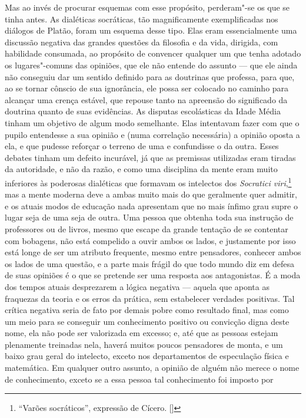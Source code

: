 Mas ao invés de procurar esquemas com esse propósito, perderam"-se os
que se tinha antes. As dialéticas socráticas, tão magnificamente
exemplificadas nos diálogos de Platão, foram um esquema desse tipo.
Elas eram essencialmente uma discussão negativa das grandes questões da
filosofia e da vida, dirigida, com habilidade consumada, ao propósito
de convencer qualquer um que tenha adotado os lugares"-comuns das
opiniões, que ele não entende do assunto --- que ele ainda não
conseguiu dar um sentido definido para as doutrinas que professa, para
que, ao se tornar cônscio de sua ignorância, ele possa ser colocado no
caminho para alcançar uma crença estável, que repouse tanto na
apreensão do significado da doutrina quanto de suas evidências.
As disputas escolásticas da Idade Média tinham um objetivo de algum
modo semelhante. Elas intentavam fazer com que o pupilo entendesse a
sua opinião e (numa correlação necessária) a opinião oposta a ela, e
que pudesse reforçar o terreno de uma e confundisse o da outra. Esses
debates tinham um defeito incurável, já que as premissas utilizadas
eram tiradas da autoridade, e não da razão, e como uma disciplina da
mente eram muito inferiores às poderosas dialéticas que formavam os
intelectos dos \textit{Socratici viri},\footnote{ ``Varões socráticos'', expressão de Cícero. []} 
mas a mente moderna deve a ambas muito mais do que geralmente
quer admitir, e os atuais modos de educação nada apresentam que no mais
ínfimo grau supre o lugar seja de uma seja de outra. Uma pessoa que
obtenha toda sua instrução de professores ou de livros, mesmo que
escape da grande tentação de se contentar com bobagens, não está compelido
a ouvir ambos os lados, e justamente por isso está longe de
ser um atributo frequente, mesmo entre pensadores, conhecer ambos os
lados de uma questão, e a parte mais frágil do que todo mundo diz em
defesa de suas opiniões é o que se pretende ser uma resposta aos 
antagonistas. É a moda dos tempos atuais desprezarem a lógica negativa 
--- aquela que aponta as fraquezas da teoria e os erros da prática, sem
estabelecer verdades positivas. Tal crítica negativa seria de fato por
demais pobre como resultado final, mas como um meio para se conseguir
um conhecimento positivo ou convicção digna deste nome, ela não pode
ser valorizada em excesso; e, até que as pessoas estejam plenamente
treinadas nela, haverá muitos poucos pensadores de monta, e um baixo
grau geral do intelecto, exceto nos departamentos de especulação física
e matemática. Em qualquer outro assunto, a opinião de alguém não merece o
nome de conhecimento, exceto se a essa pessoa tal conhecimento foi imposto por
